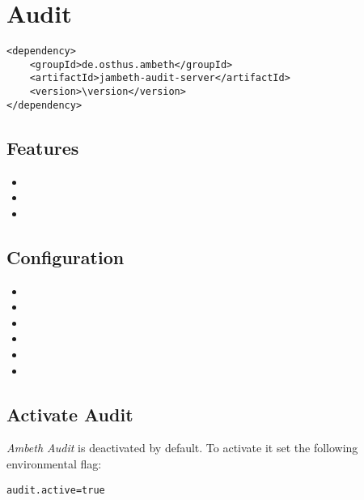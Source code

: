 \section{Audit}
\label{module:Audit}
\ClearAPI
\begin{lstlisting}[style=POM,caption={Maven modules to use \emph{Audit}}]
<dependency>
	<groupId>de.osthus.ambeth</groupId>
	<artifactId>jambeth-audit-server</artifactId>
	<version>\version</version>
</dependency>
\end{lstlisting}
\TODO
\subsection{Features}
\begin{itemize}
	\item {}
	\item {}
	\item {}
\end{itemize}

\subsection{Configuration}
\begin{itemize}
	\item {}
	\item {}
	\item {}
	\item {}
	\item {}
	\item {}
\end{itemize}

\subsection{Activate Audit}
\textit{Ambeth Audit} is deactivated by default. To activate it set the following environmental flag:
\begin{lstlisting}[style=Props]
audit.active=true
\end{lstlisting}

